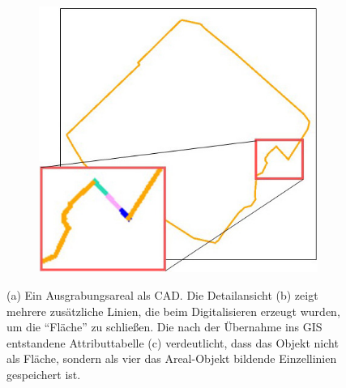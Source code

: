 \begin{itemize}
\begin{figure}[h!tbp]
\begin{subfigure}{.3\textwidth}
  \caption{}
\end{subfigure}\hspace{1cm}%
\begin{subfigure}{.3\textwidth}
  \centering
  \includegraphics[width=\linewidth]{bilder/vektor_polylinienB}
  \caption{}
\end{subfigure}
\begin{subfigure}{\textwidth}
  \centering
		\footnotesize
  \caption{}
\end{subfigure}
\caption{(a) Ein Ausgrabungsareal als CAD. Die Detailansicht (b) zeigt mehrere zusätzliche Linien, die beim Digitalisieren erzeugt wurden, um die "`Fläche"' zu schließen. Die nach der Übernahme ins GIS entstandene Attributtabelle (c) verdeutlicht, dass das Objekt nicht als Fläche, sondern als vier das Areal-Objekt bildende Einzellinien gespeichert ist.}
\label{abb:vektor_polylinien}
\end{figure}


\end{itemize}
